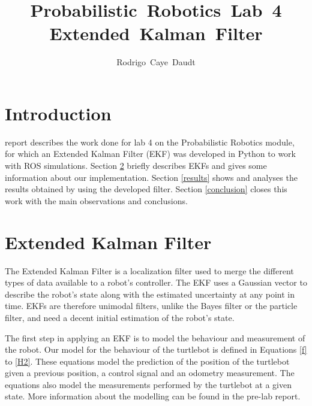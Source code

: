 \documentclass[journal]{IEEEtran}
\begin{document}
\title{Probabilistic~Robotics~Lab~4 \\ Extended~Kalman~Filter}
%

\author{Rodrigo~Caye~Daudt}





\maketitle



\section{Introduction}

 report describes the work done for lab 4 on the Probabilistic Robotics module, for which an Extended Kalman Filter (EKF) was developed in Python to work with ROS simulations. Section \ref{ekf} briefly describes EKFs and gives some information about our implementation. Section \ref{results} shows and analyses the results obtained by using the developed filter. Section \ref{conclusion} closes this work with the main observations and conclusions.

\section{Extended Kalman Filter}\label{ekf}

The Extended Kalman Filter is a localization filter used to merge the different types of data available to a robot's controller. The EKF uses a Gaussian vector to describe the robot's state along with the estimated uncertainty at any point in time. EKFs are therefore unimodal filters, unlike the Bayes filter or the particle filter, and need a decent initial estimation of the robot's state.

The first step in applying an EKF is to model the behaviour and measurement of the robot. Our model for the behaviour of the turtlebot is defined in Equations \ref{f} to \ref{H2}. These equations model the prediction of the position of the turtlebot given a previous position, a control signal and an odometry measurement. The equations also model the measurements performed by the turtlebot at a given state. More information about the modelling can be found in the pre-lab report.
\end{document}
